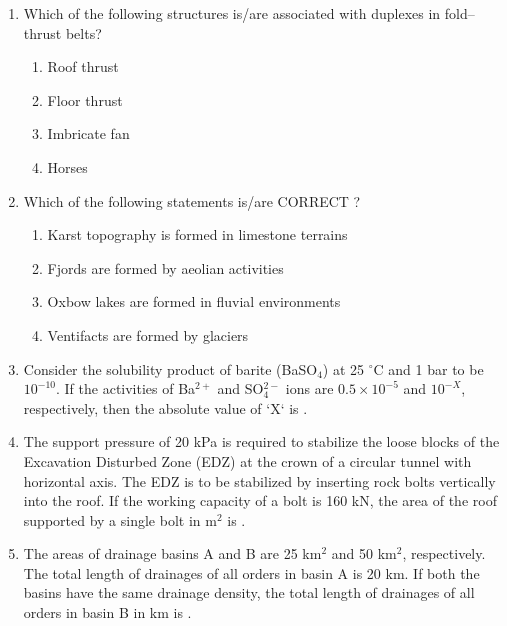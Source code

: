 \documentclass[journal,12pt,onecolumn]{IEEEtran}
\begin{document}
\begin{enumerate}
\item Which of the following structures is/are associated with duplexes in fold–thrust belts?  

\hfill{}

\begin{multicols}{2}
\begin{enumerate}
\item Roof thrust
\item Floor thrust
\item Imbricate fan
\item Horses
\end{enumerate}
\end{multicols}




\item Which of the following statements is/are CORRECT ?  

\hfill{}


\begin{enumerate}
\item Karst topography is formed in limestone terrains
\item Fjords are formed by aeolian activities
\item Oxbow lakes are formed in fluvial environments
\item Ventifacts are formed by glaciers
\end{enumerate}


\item Consider the solubility product of barite (BaSO$_4$) at 25 $^\circ$C and 1 bar to be $10^{-10}$. If the activities of Ba$^{2+}$ and SO$_4^{2-}$ ions are $0.5 \times 10^{-5}$ and $10^{-X}$, respectively, then the absolute value of `X` is  .  

\hfill{}

\item The support pressure of 20 kPa is required to stabilize the loose blocks of the Excavation Disturbed Zone (EDZ) at the crown of a circular tunnel with horizontal axis. The EDZ is to be stabilized by inserting rock bolts vertically into the roof. If the working capacity of a bolt is 160 kN, the area of the roof supported by a single bolt in m$^2$ is .  

\hfill{}

\item The areas of drainage basins A and B are 25 km$^2$ and 50 km$^2$, respectively. The total length of drainages of all orders in basin A is 20 km. If both the basins have the same drainage density, the total length of drainages of all orders in basin B in km is .  


\end{enumerate}
\end{document}
